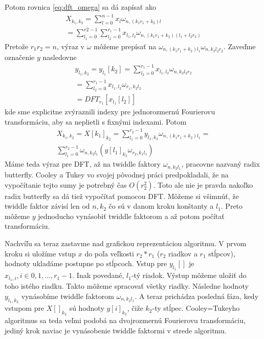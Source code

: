 Potom rovnica \ref{eq:dft_omega} sa dá zapísať ako
\begin{equation}
    \begin{split}
    X_{k_1,k_2} = \sum_{l=0}^{n-1} x_l \omega_{n, (k_1 r_1 + k_2) l} \\
       = \sum_{l_1=0}^{r2-1} \sum_{l_2=0}^{r_1-1}
            x_{l_1,l_2} \omega_{n, (k_1 r_1 + k_2) (l_1 + l_2 r_2)}
    \end{split}
\end{equation}
Pretože $r_1 r_2 = n$, výraz v $\omega$ môžeme prepísať na
$\omega_{n, (k_1 r_1 + k_2) l_1} \omega_{n, k_2 l_2 r_2}$.
Zaveďme označenie $y$ nasledovne
\begin{equation}
    \begin{split}
    y_{l_1,k_2} = y_{l_1}[k_2] = 
        \sum_{l_2=0}^{r_1-1} x_{l_1,l_2} \omega_{n, k_2 l_2 r_2}  \\
       = \sum_{l_2=0}^{r_1-1} x_{l_1,l_2} \omega_{r_1, k_2 l_2}  \\        
        = DFT_{r_1}[x_{l_1}[l_2]]
    \end{split}
\end{equation}
kde sme explicitne zvýraznili indexy pre jednorozmernú Fourierovu
transformáciu, aby sa neplietli s fixnými indexami.
Potom 
\begin{equation}
    \begin{split}
    X_{k_1,k_2} = X[k_1]_{k_2}
     = \sum_{l_1=0}^{r_2-1} y_{l_1,k_2} \omega_{n,(k_1 r_1
    + k_2) l_1} =  \\
     \sum_{l_1=0}^{r_2-1}
     \omega_{n, k_2 l_1} \left( y[l_1]_{k_2} \omega_{r_2, k_1 l_1}
     \right)
    \end{split}
\end{equation}
Máme teda výraz pre DFT, až na twiddle faktory $\omega_{n,k_2 l_1}$,
pracovne nazvaný radix butterfly.
Cooley a Tukey vo svojej pôvodnej práci predpokladali, že na
vypočítanie tejto sumy je potrebný čas $O(r_2^2)$. 
Toto ale nie je pravda nakoľko radix butterfly sa dá tiež 
vypočítať pomocou DFT. Môžeme si všimnúť, že twiddle faktor závisí
len od $n, k_2$ čo sú v danom kroku konštanty a $l_1$. Preto môžeme
$y$ jednoducho vynásobiť twiddle faktorom a až potom počítať
transformáciu.

Nachvíľu sa teraz zastavme nad grafickou reprezentáciou algoritmu.
V prvom kroku si uložíme vstup $x$ do poľa veľkosti $r_2*r_1$ ($r_2$ riadkov a
$r_1$ stĺpcov), hodnoty ukladáme postupne po stĺpcoch.
Vstup pre $y_{l_1}[]$ je $x_{l_1,i}, i\in0,1,\dots,r_1-1$. Inak
povedané, $l_1$-tý riadok. Výstup môžeme uložiť do toho istého riadku.
Takto môžeme spracovať všetky riadky.
Následne hodnoty $y_{l_1, k_2}$ vynásobíme twiddle faktorom
$\omega_{n, k_2 l_1}$.
A teraz prichádza posledná fáza, kedy vstupom pre
 $X[]_{k_2}$ sú hodnoty $y[i]_{k_2}$, čiže $k_2$-ty stĺpec.
Cooley=Tukeyho algoritmus sa teda veľmi podobá na dvojrozmernú
Fourierovu transformáciu, jediný krok naviac je vynásobenie twiddle
faktormi v strede algoritmu.

